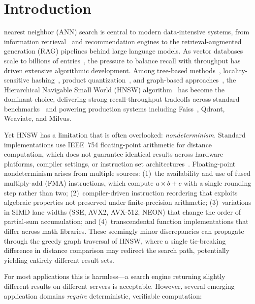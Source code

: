 \documentclass[10pt,journal]{IEEEtran}
\newcommand{\hnsw}{\textsc{HNSW}}
\begin{document}
\section{Introduction}
 nearest neighbor (ANN) search is central to modern data-intensive systems, from information retrieval~\cite{jegou2011pq} and recommendation engines to the retrieval-augmented generation (RAG) pipelines behind large language models. As vector databases scale to billions of entries~\cite{simhadri2022neurips}, the pressure to balance recall with throughput has driven extensive algorithmic development. Among tree-based methods~\cite{bentley1975kdtree}, locality-sensitive hashing~\cite{gionis1999lsh}, product quantization~\cite{jegou2011pq}, and graph-based approaches~\cite{malkov2014nsw}, the Hierarchical Navigable Small World (\hnsw{}) algorithm~\cite{malkov2020hnsw} has become the dominant choice, delivering strong recall-throughput tradeoffs across standard benchmarks~\cite{simhadri2022neurips} and powering production systems including Faiss~\cite{douze2024faiss}, Qdrant, Weaviate, and Milvus.

Yet \hnsw{} has a limitation that is often overlooked: \emph{nondeterminism}. Standard implementations use IEEE~754 floating-point arithmetic for distance computation, which does not guarantee identical results across hardware platforms, compiler settings, or instruction set architectures~\cite{goldberg1991float}. Floating-point nondeterminism arises from multiple sources: (1)~the availability and use of fused multiply-add (FMA) instructions, which compute $a \times b + c$ with a single rounding step rather than two; (2)~compiler-driven instruction reordering that exploits algebraic properties not preserved under finite-precision arithmetic; (3)~variations in SIMD lane widths (SSE, AVX2, AVX-512, NEON) that change the order of partial-sum accumulation; and (4)~transcendental function implementations that differ across math libraries. These seemingly minor discrepancies can propagate through the greedy graph traversal of \hnsw{}, where a single tie-breaking difference in distance comparison may redirect the search path, potentially yielding entirely different result sets.

For most applications this is harmless---a search engine returning slightly different results on different servers is acceptable. However, several emerging application domains \emph{require} deterministic, verifiable computation:
\end{document}
